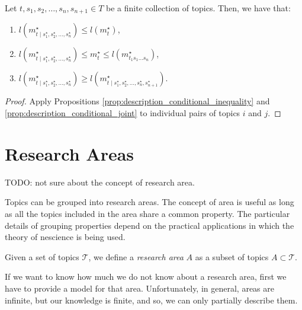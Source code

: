 \begin{proposition}
\label{prop:joint_multiple_topics}
Let $t, s_1, s_2, \ldots, s_n, s_{n+1} \in T$ be a finite collection of topics. Then, we have that:

\renewcommand{\theenumi}{\roman{enumi}}
\begin{enumerate}
\item $l \left( m_{t \mid s_1^\star, s_2^\star, \ldots, s_n^\star}^\star \right) \leq l \left( m^\star_t \right)$,
\item $l \left( m_{t \mid s_1^\star, s_2^\star, \ldots, s_n^\star}^\star \right) \leq m_t^\star \leq l(m_{t_1 s_1 \ldots s_n}^\star)$,
\item $l \left( m_{t \mid s_1^\star, s_2^\star, \ldots, s_n^\star}^\star \right) \geq l \left( m_{t \mid s_1^\star, s_2^\star, \ldots, s_n^\star, s_{n+1}^\star}^\star \right)$.
\end{enumerate}
\end{proposition}
\begin{proof}
Apply Propositions \ref{prop:description_conditional_inequality} and \ref{prop:description_conditional_joint} to individual pairs of topics $i$ and $j$.
\end{proof}


%
%

\section{Research Areas}
\label{sec:areas}

{\color{red} TODO: not sure about the concept of research area.}

Topics can be grouped into research areas. The concept of area is useful as long as all the topics included in the area share a common property. The particular details of grouping properties depend on the practical applications in which the theory of nescience is being used.

\begin{definition}
Given a set of topics $\mathcal{T}$, we define a \emph{research area} $A$ as a subset of topics $A \subset \mathcal{T}$.
\end{definition}

If we want to know how much we do not know about a research area, first we have to provide a model for that area. Unfortunately, in general, areas are infinite, but our knowledge is finite, and so, we can only partially describe them.

